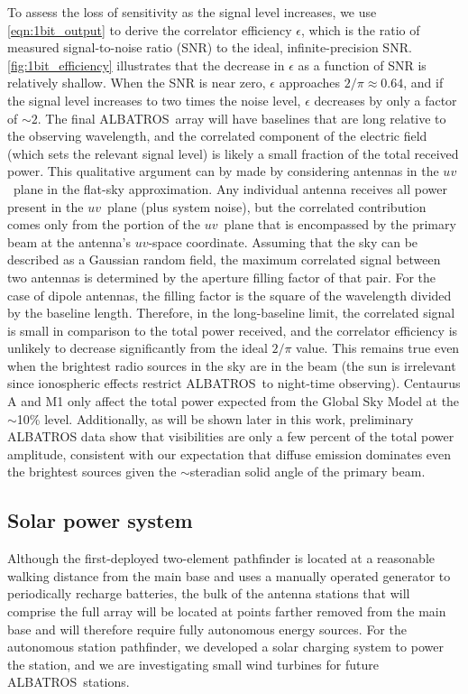 \documentclass{ws-jai}
\def\albatros{ALBATROS}
\begin{document}
To assess the loss of sensitivity as the signal level increases, we
use \autoref{eqn:1bit_output} to derive the correlator efficiency
$\epsilon$, which is the ratio of measured signal-to-noise ratio (SNR)
to the ideal, infinite-precision SNR.  \autoref{fig:1bit_efficiency}
illustrates that the decrease in $\epsilon$ as a function of SNR is
relatively shallow.  When the SNR is near zero, $\epsilon$ approaches
$2/\pi \approx 0.64$, and if the signal level increases to two times
the  
noise level, $\epsilon$ decreases by only a factor of $\sim2$.  The
final \albatros\ array will have baselines that are long relative to
the observing wavelength, and the correlated component of the electric
field (which sets the relevant signal level) is likely a small
fraction of the total received power.  This qualitative argument can
by made by considering antennas in the $uv$~plane in the flat-sky
approximation.  Any individual antenna receives all power present in
the $uv$~plane (plus system noise), but the correlated contribution
comes only from the portion of the $uv$~plane that is encompassed by
the primary beam at the antenna's $uv$-space coordinate.  Assuming
that the sky can be described as a Gaussian random field, the maximum
correlated signal between two antennas is determined by the aperture
filling factor of that pair.  For the case of dipole antennas, the
filling factor is the square of the wavelength divided by the baseline
length.  Therefore, in the long-baseline limit, the correlated signal
is small in comparison to the total power received, and the correlator
efficiency is unlikely to decrease significantly from the ideal
$2/\pi$ value.  This remains true even when the brightest radio
sources in the sky are in the beam (the sun is irrelevant since
ionospheric effects restrict \albatros\ to night-time observing).
Centaurus A \citep{culgoora1} and M1 \citep{Braude1969} only affect
the total power expected from the Global Sky Model \citep{gsm2008} at
the $\sim$10\% level.  Additionally, as will be shown later in this
work, preliminary ALBATROS data show that visibilities are only a few
percent of the total power amplitude, consistent with our expectation
that diffuse emission dominates even the brightest sources given the
$\sim$steradian solid angle of the primary beam.

\subsection{Solar power system}

Although the first-deployed two-element pathfinder is located at a
reasonable walking distance from the main base and uses a manually
operated generator to periodically recharge batteries, the bulk of the
antenna stations that will comprise the full array will be located at
points farther removed from the main base and will therefore require
fully autonomous energy sources.  For the autonomous station
pathfinder, we developed a solar charging system to power the station,
and we are investigating small wind turbines for future
\albatros\ stations.
\end{document}
